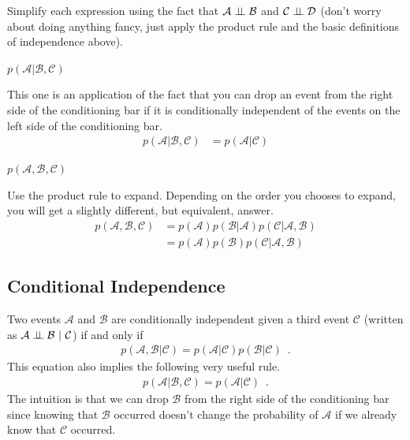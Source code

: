 \documentclass{tufte-handout}
\begin{document}
\begin{exercise}
Simplify each expression using the fact that $\mathcal{A} \perp\!\!\!\perp \mathcal{B}$ and $\mathcal{C} \perp\!\!\!\perp \mathcal{D}$ (don't worry about doing anything fancy, just apply the product rule and the basic definitions of independence above).
\bes
\item $p(\mathcal{A} | \mathcal{B}, \mathcal{C})$
\begin{boxedsolution}
This one is an application of the fact that you can drop an event from the right side of the conditioning bar if it is conditionally independent of the events on the left side of the conditioning bar.
\begin{align}
p(\mathcal{A} | \mathcal{B}, \mathcal{C}) &= p(\mathcal{A} | \mathcal{C})
\end{align}
\end{boxedsolution}
\item $p(\mathcal{A}, \mathcal{B}, \mathcal{C})$
\begin{boxedsolution}
Use the product rule to expand.  Depending on the order you chooses to expand, you will get a slightly different, but equivalent, answer.
\begin{align}
p(\mathcal{A}, \mathcal{B}, \mathcal{C}) &= p(\mathcal{A}) p(\mathcal{B}| \mathcal{A}) p(\mathcal{C} | \mathcal{A}, \mathcal{B}) \nonumber \\
&= p(\mathcal{A}) p(\mathcal{B}) p(\mathcal{C} | \mathcal{A}, \mathcal{B}) \nonumber
\end{align}
\end{boxedsolution}
\ees
\end{exercise}

\subsection{Conditional Independence}


Two events $\mathcal{A}$ and $\mathcal{B}$ are conditionally independent given a third event $\mathcal{C}$ (written as $\mathcal{A} \perp\!\!\!\perp \mathcal{B}~|~\mathcal{C}$) if and only if
\begin{align}
p(\mathcal{A}, \mathcal{B} | \mathcal{C}) = p(\mathcal{A} | \mathcal{C}) p(\mathcal{B} | \mathcal{C}) \enspace .
\end{align}
This equation also implies the following very useful rule.
\begin{align}
p(\mathcal{A} | \mathcal{B}, \mathcal{C}) = p(\mathcal{A} | \mathcal{C}) \enspace .
\end{align}
The intuition is that we can drop $\mathcal{B}$ from the right side of the conditioning bar since knowing that $\mathcal{B}$ occurred doesn't change the probability of $\mathcal{A}$ if we already know that $\mathcal{C}$ occurred.
\end{document}
